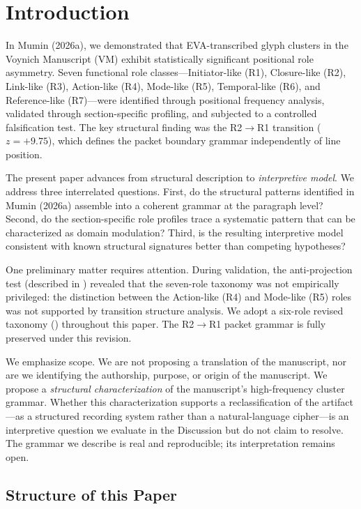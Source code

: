 \documentclass[11pt,a4paper,twocolumn]{article}
\begin{document}
\section{Introduction}
\label{sec:intro}

In Mumin (2026a), we demonstrated that EVA-transcribed glyph clusters in the Voynich Manuscript (VM) exhibit statistically significant positional role asymmetry. Seven functional role classes---Initiator-like (R1), Closure-like (R2), Link-like (R3), Action-like (R4), Mode-like (R5), Temporal-like (R6), and Reference-like (R7)---were identified through positional frequency analysis, validated through section-specific profiling, and subjected to a controlled falsification test. The key structural finding was the R2$\to$R1 transition ($z = +9.75$), which defines the packet boundary grammar independently of line position.

The present paper advances from structural description to \textit{interpretive model}. We address three interrelated questions. First, do the structural patterns identified in Mumin (2026a) assemble into a coherent grammar at the paragraph level? Second, do the section-specific role profiles trace a systematic pattern that can be characterized as domain modulation? Third, is the resulting interpretive model consistent with known structural signatures better than competing hypotheses?

One preliminary matter requires attention. During validation, the anti-projection test (described in ) revealed that the seven-role taxonomy was not empirically privileged: the distinction between the Action-like (R4) and Mode-like (R5) roles was not supported by transition structure analysis. We adopt a six-role revised taxonomy () throughout this paper. The R2$\to$R1 packet grammar is fully preserved under this revision.

We emphasize scope. We are not proposing a translation of the manuscript, nor are we identifying the authorship, purpose, or origin of the manuscript. We propose a \textit{structural characterization} of the manuscript's high-frequency cluster grammar. Whether this characterization supports a reclassification of the artifact---as a structured recording system rather than a natural-language cipher---is an interpretive question we evaluate in the Discussion but do not claim to resolve. The grammar we describe is real and reproducible; its interpretation remains open.

\subsection{Structure of this Paper}
\end{document}
